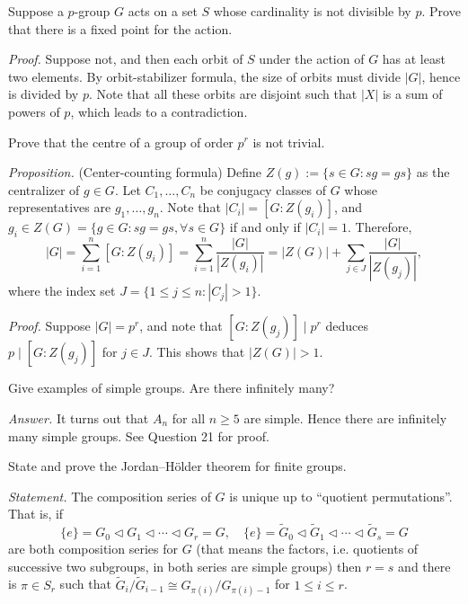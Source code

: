 \documentclass{mathproblems}
\begin{document}
\begin{questions}

\miquestion
{\color{blue} Suppose a $p$-group $G$ acts on a set $S$ whose cardinality is not divisible by $p$. Prove that there is a fixed point for the action.}

\textit{Proof.} Suppose not, and then each orbit of $S$ under the action of $G$ has at least two elements. By orbit-stabilizer formula, the size of orbits must divide $|G|$, hence is divided by $p$. Note that all these orbits are disjoint such that $|X|$ is a sum of powers of $p$, which leads to a contradiction.

\miquestion
{\color{blue} Prove that the centre of a group of order $p^r$ is not trivial.}

{\color{violet}
\textit{Proposition.} (Center-counting formula) Define $Z(g):=\{s\in G: sg=gs\}$ as the centralizer of $g\in G$. Let $C_1,\ldots,C_n$ be conjugacy classes of $G$ whose representatives are $g_1,\ldots,g_n$. Note that $|C_i|=[G:Z(g_i)]$, and $g_i\in Z(G)=\{g\in G: sg=gs,\forall s\in G\}$ if and only if $|C_i|=1$. Therefore,
$$
|G|=\sum_{i=1}^{n}[G: Z(g_{i})]=\sum_{i=1}^{n} \frac{|G|}{|Z(g_{i})|}=|Z(G)|+\sum_{j\in J}\frac{|G|}{|Z(g_{j})|},
$$
where the index set $J=\{1\leqslant j\leqslant n: |C_j|>1\}$. 
}

\textit{Proof.} Suppose $|G|=p^r$, and note that $[G:Z(g_j)]\mid p^r$ deduces $p\mid [G:Z(g_j)]$ for $j\in J$. This shows that $|Z(G)|>1$.


\miquestion
{\color{blue} Give examples of simple groups. Are there infinitely many?}

\textit{Answer.} It turns out that $A_n$ for all $n\geqslant 5$ are simple. Hence there are infinitely many simple groups. See Question 21 for proof.

\miquestion
{\color{blue} State and prove the Jordan--H\"older theorem for finite groups.}

\textit{Statement.} The composition series of $G$ is unique up to ``quotient permutations''. That is, if
$$
\{e\}=G_{0} \triangleleft G_{1} \triangleleft \cdots \triangleleft G_{r}=G,\quad \{e\}=\widetilde{G}_{0} \triangleleft \widetilde{G}_{1} \triangleleft \cdots \triangleleft \widetilde{G}_{s}=G
$$
are both composition series for $G$ (that means the factors, i.e. quotients of successive two subgroups, in both series are simple groups) then $r=s$ and there is $\pi \in S_{r}$ such that $\widetilde{G}_{i} / \widetilde{G}_{i-1} \cong G_{\pi(i)} / G_{\pi(i)-1}$ for $1 \leqslant i \leqslant r$.


\end{questions}
\end{document}
